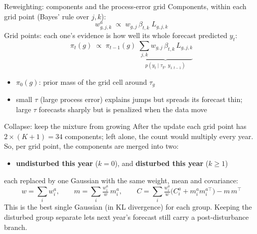 \documentclass[aspectratio=169,12pt]{beamer}
\newcommand{\muted}[1]{{\color{black!55}#1}}
\begin{document}
\begin{frame}{Reweighting: components and the process-error grid}
  Components, within each grid point (Bayes' rule over $j, k$):
  \[
    w^a_{g,j,k} \;\propto\; w_{g,j}\,\beta_{t,k}\; L_{g,j,k}
  \]
  Grid points: each one's evidence is how well its whole forecast predicted $y_t$:
  \[
    \pi_t(g) \;\propto\; \pi_{t-1}(g)\; \underbrace{\sum_{j,k} w_{g,j}\,\beta_{t,k}\,L_{g,j,k}}_{p(y_t \mid \tau_g,\ y_{1:t-1})}
  \]
  \begin{itemize}
    \item $\pi_0(g)$: prior mass of the grid cell around $\tau_g$
    \item small $\tau$ (large process error) explains jumps but spreads its forecast thin;
          large $\tau$ forecasts sharply but is penalized when the data move
  \end{itemize}
\end{frame}

\begin{frame}{Collapse: keep the mixture from growing}
  After the update each grid point has $2 \times (K+1) = 34$ components; left alone, the
  count would multiply every year. So, per grid point, the components are merged into two:
  \begin{itemize}
    \item \textbf{undisturbed this year} ($k = 0$), and \textbf{disturbed this year} ($k \ge 1$)
  \end{itemize}
  each replaced by one Gaussian with the same weight, mean and covariance:
  \[
    w = \sum_i w^a_i, \qquad
    m = \sum_i \tfrac{w^a_i}{w}\, m^a_i, \qquad
    C = \sum_i \tfrac{w^a_i}{w} \big(C^a_i + m^a_i m^{a\top}_i\big) - m\,m^\top
  \]
  \muted{This is the best single Gaussian (in KL divergence) for each group. Keeping the disturbed
  group separate lets next year's forecast still carry a post-disturbance branch.}
\end{frame}
\end{document}
